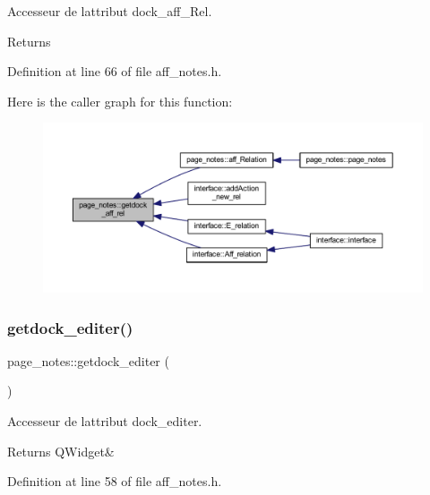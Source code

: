 Accesseur de l\textquotesingle{}attribut dock\+\_\+aff\+\_\+\+Rel. 

\begin{DoxyReturn}{Returns}

\end{DoxyReturn}


Definition at line 66 of file aff\+\_\+notes.\+h.

Here is the caller graph for this function\+:\nopagebreak
\begin{figure}[H]
\begin{center}
\leavevmode
\includegraphics[width=350pt]{classpage__notes_ab1019034677a5e10b14980864abdd21e_icgraph}
\end{center}
\end{figure}
\mbox{\label{classpage__notes_ad6002a4d63da2fbfa4a12a591a0d436e}} 
\subsubsection{\texorpdfstring{getdock\+\_\+editer()}{getdock\_editer()}}
{\footnotesize\ttfamily page\+\_\+notes\+::getdock\+\_\+editer (\begin{DoxyParamCaption}{ }\end{DoxyParamCaption})\hspace{0.3cm}{\ttfamily [inline]}}



Accesseur de l\textquotesingle{}attribut dock\+\_\+editer. 

\begin{DoxyReturn}{Returns}
Q\+Widget\& 
\end{DoxyReturn}


Definition at line 58 of file aff\+\_\+notes.\+h.

